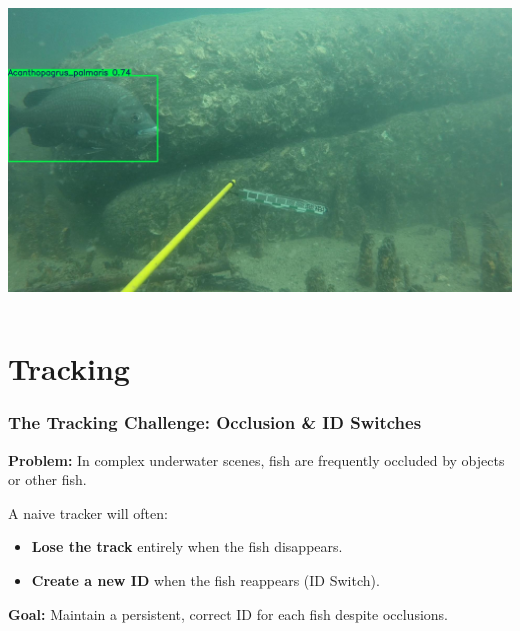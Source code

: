 \documentclass[serif]{beamer}  %
\begin{document}
\begin{frame}
\begin{columns}
\begin{column}{0.5\textwidth}
	\centering
	\includegraphics[width=\textwidth]{images/9908_Acanthopagrus_palmaris_f000010.jpg}
\end{column}
\end{columns}


\end{frame}

\section{Tracking}

\begin{frame}
    \frametitle{The Tracking Challenge: Occlusion \& ID Switches}
    
    \textbf{Problem:} In complex underwater scenes, fish are frequently occluded by objects or other fish.
    \vspace{1em}
            
    A naive tracker will often:
    \begin{itemize}
        \item \textbf{Lose the track} entirely when the fish disappears.
        \item \textbf{Create a new ID} when the fish reappears (\textcolor{deepred}{ID Switch}).
    \end{itemize}
    
    \vspace{1em}
    \textbf{Goal:} Maintain a persistent, correct ID for each fish despite occlusions.
\end{frame}
\end{document}
